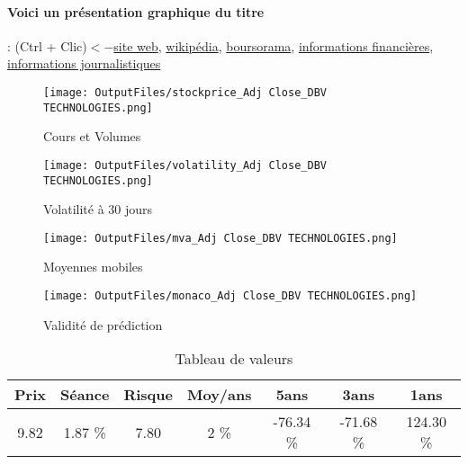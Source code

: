 \documentclass[11pt,a4paper]{report}%
\begin{document}
\paragraph{Voici un présentation graphique du titre} : (Ctrl + Clic)$<-$\href{https://www.dbv-technologies.com/fr/}{site web}, \href{https://fr.wikipedia.org/wiki/DBV_Technologies}{wikipédia}, \href{https://www.boursorama.com/cours/1rPDBV}{boursorama}, \href{https://www.qwant.com/?q=site:https:%2f%2fwww.easybourse.com%2faction-societe%2fDBV-TECHNOLOGIES&t=web&client=ext-firefox-hp}{informations financières}, \href{https://bourse.lerevenu.com/cours-de-bourse/fiche-valeur-synthese/DBV-TECHNOLOGIES/DBV-FR}{informations journalistiques}
\begin{figure}[!htb]
   \begin{minipage}{0.5\textwidth}
     \centering
     \texttt{[image: OutputFiles/stockprice\_Adj Close\_DBV TECHNOLOGIES.png]}
     \caption{Cours et Volumes}\label{Fig:price_DBV TECHNOLOGIES}
   \end{minipage}\hfill
   \begin{minipage}{0.5\textwidth}
     \centering
     \texttt{[image: OutputFiles/volatility\_Adj Close\_DBV TECHNOLOGIES.png]}
     \caption{Volatilité à 30 jours}\label{Fig:volat_DBV TECHNOLOGIES}
   \end{minipage}
\end{figure}
\begin{figure}[!htb]
   \begin{minipage}{0.5\textwidth}
     \centering
     \texttt{[image: OutputFiles/mva\_Adj Close\_DBV TECHNOLOGIES.png]}
     \caption{Moyennes mobiles}\label{Fig:mva_DBV TECHNOLOGIES}
   \end{minipage}\hfill
   \begin{minipage}{0.5\textwidth}
     \centering
     \texttt{[image: OutputFiles/monaco\_Adj Close\_DBV TECHNOLOGIES.png]}
     \caption{Validité de prédiction}\label{Fig:prediction_DBV TECHNOLOGIES}
   \end{minipage}
\end{figure}

\begin{table}[H]
  \centering
    \begin{tabular}{|c|c|c|c|c|c|c|}
    \hline
    Prix & Séance & Risque  & Moy/ans & 5ans & 3ans & 1ans \\
    \hline
    9.82 &    1.87 \%    & 7.80 & 2 \% & -76.34 \% & -71.68 \% & 124.30 \% \\
    \hline
    \end{tabular}%
        \label{tab:table_DBV TECHNO2IES}%
      \caption{Tableau de valeurs}
\end{table}%
\end{document}
